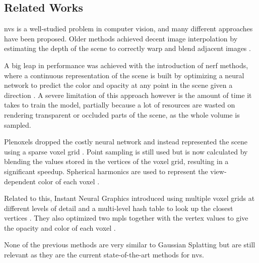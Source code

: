 \subsection{Related Works}
\gls{nvs} is a well-studied problem in computer vision, and many different approaches have been proposed.
Older methods achieved decent image interpolation by estimating the depth of the scene to correctly warp and blend adjacent images \cite{zitnickHighqualityVideoView2004}.

A big leap in performance was achieved with the introduction of \gls{nerf} methods, where a continuous representation of the scene is built by optimizing a neural network to predict the color and opacity at any point in the scene given a direction \cite{mildenhallNeRFRepresentingScenes2020a}.
A severe limitation of this approach however is the amount of time it takes to train the model, partially because a lot of resources are wasted on rendering transparent or occluded parts of the scene, as the whole volume is sampled.

Plenoxels dropped the costly neural network and instead represented the scene using a sparse voxel grid \cite{yuPlenoxelsRadianceFields2021a}.
Point sampling is still used but is now calculated by blending the values stored in the vertices of the voxel grid, resulting in a significant speedup. Spherical harmonics are used to represent the view-dependent color of each voxel \cite{yuPlenoxelsRadianceFields2021a}.

Related to this, Instant Neural Graphics introduced using multiple voxel grids at different levels of detail and a multi-level hash table to look up the closest vertices \cite{mullerInstantNeuralGraphics2022}.
They also optimized two \glspl{mpl} together with the vertex values to give the opacity and color of each voxel \cite{mullerInstantNeuralGraphics2022}.

None of the previous methods are very similar to Gaussian Splatting but are still relevant as they are the current state-of-the-art methods for \gls{nvs}.



